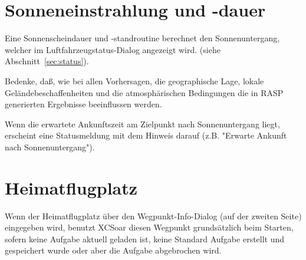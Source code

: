 \section{Sonneneinstrahlung und -dauer}

Eine Sonnenscheindauer und -standroutine berechnet den Sonnenuntergang, welcher im Luftfahrzeugstatus-Dialog angezeigt wird. (siehe Abschnitt~\ref{sec:status}).

Bedenke, daß, wie bei allen Vorhersagen, die geographische Lage, lokale Geländebeschaffenheiten und die atmosphärischen Bedingungen die in RASP generierten Ergebnisse beeinflussen werden.

Wenn die erwartete Ankunftszeit am Zielpunkt nach Sonnenuntergang liegt, erscheint eine Statusmeldung mit dem Hinweis darauf (z.B. "Erwarte Ankunft nach Sonnenuntergang").

\section{Heimatflugplatz}
Wenn der Heimatflugplatz über den Wegpunkt-Info-Dialog (auf der zweiten Seite) eingegeben wird, benutzt \textsf{XCSoar} diesen Wegpunkt grundsätzlich beim Starten, sofern keine Aufgabe aktuell geladen ist, keine Standard Aufgabe erstellt und gespeichert wurde oder aber die Aufgabe abgebrochen wird. 
\clearpage

